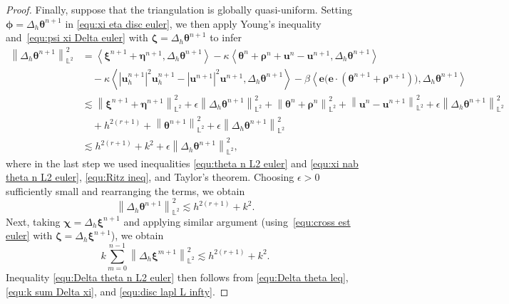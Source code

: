 \documentclass[11pt, reqno]{amsart}
\theoremstyle{definition}
\theoremstyle{remark}
\numberwithin{equation}{section}
\newcommand{\bff}{\boldsymbol}
\newcommand{\bb}{\mathbb}
\newcommand{\norm}[2]{\left\|{#1}\right\|_{#2}}
\newcommand{\inpro}[2]{\left\langle#1,#2\right\rangle}
\newcommand{\abs}[1]{\left|{#1}\right|}
\begin{document}
\begin{proof}
	Finally, suppose that the triangulation is globally quasi-uniform. Setting $\bff{\phi}=\Delta_h \bff{\theta}^{n+1}$ in \eqref{equ:xi eta disc euler}, we then apply Young's inequality and~\eqref{equ:psi xi Delta euler} with $\bff{\zeta}=\Delta_h \bff{\theta}^{n+1}$ to infer
	\begin{align*}
		\norm{\Delta_h \bff{\theta}^{n+1}}{\bb{L}^2}^2
		&=
		\inpro{\bff{\xi}^{n+1}+\bff{\eta}^{n+1}}{\Delta_h \bff{\theta}^{n+1}}
		-
		\kappa \inpro{\bff{\theta}^n+\bff{\rho}^n+\bff{u}^n-\bff{u}^{n+1}}{\Delta_h \bff{\theta}^{n+1}}
		\\
		&\quad
		-
		\kappa \inpro{\abs{\bff{u}_h^{n+1}}^2 \bff{u}_h^{n+1} - \abs{\bff{u}^{n+1}}^2 \bff{u}^{n+1}}{\Delta_h \bff{\theta}^{n+1}}
		-
		\beta \inpro{\bff{e}\big(\bff{e}\cdot (\bff{\theta}^{n+1}+\bff{\rho}^{n+1})\big)}{\Delta_h \bff{\theta}^{n+1}}
		\\
		&\lesssim
		\norm{\bff{\xi}^{n+1}+\bff{\eta}^{n+1}}{\bb{L}^2}^2
		+
		\epsilon \norm{\Delta_h \bff{\theta}^{n+1}}{\bb{L}^2}^2
		+
		\norm{\bff{\theta}^n+\bff{\rho}^n}{\bb{L}^2}^2
		+
		\norm{\bff{u}^n-\bff{u}^{n+1}}{\bb{L}^2}^2
		+
		\epsilon \norm{\Delta_h \bff{\theta}^{n+1}}{\bb{L}^2}^2
		\\
		&\quad
		+
		h^{2(r+1)}+ \norm{\bff{\theta}^{n+1}}{\bb{L}^2}^2
		+
		\epsilon \norm{\Delta_h \bff{\theta}^{n+1}}{\bb{L}^2}^2
		\\
		&\lesssim
		h^{2(r+1)}+k^2 +\epsilon \norm{\Delta_h \bff{\theta}^{n+1}}{\bb{L}^2}^2,
	\end{align*}
	where in the last step we used inequalities \eqref{equ:theta n L2 euler} and \eqref{equ:xi nab theta n L2 euler}, \eqref{equ:Ritz ineq}, and Taylor's theorem. Choosing $\epsilon>0$ sufficiently small and rearranging the terms, we obtain
	\begin{equation}\label{equ:Delta theta leq}
		\norm{\Delta_h \bff{\theta}^{n+1}}{\bb{L}^2}^2
		\lesssim
		h^{2(r+1)}+k^2.
	\end{equation}
	Next, taking $\bff{\chi}=\Delta_h \bff{\xi}^{n+1}$ and applying similar argument (using~\eqref{equ:cross est euler} with $\bff{\zeta}=\Delta_h \bff{\xi}^{n+1}$), we obtain
	\begin{equation}\label{equ:k sum Delta xi}
		k\sum_{m=0}^{n-1} \norm{\Delta_h \bff{\xi}^{m+1}}{\bb{L}^2}^2
		\lesssim
		h^{2(r+1)}+k^2.
	\end{equation}
	Inequality \eqref{equ:Delta theta n L2 euler} then follows from \eqref{equ:Delta theta leq}, \eqref{equ:k sum Delta xi}, and \eqref{equ:disc lapl L infty}.
	

\end{proof}
\end{document}
